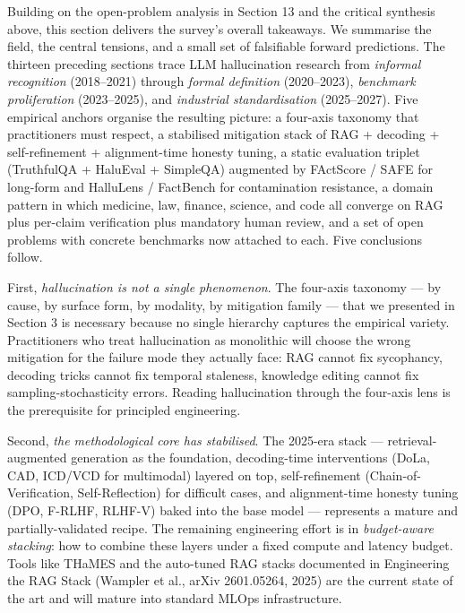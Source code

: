 \documentclass{article}
\begin{document}
Building on the open-problem analysis in Section 13 and the critical synthesis above, this section delivers the survey's overall takeaways. We summarise the field, the central tensions, and a small set of falsifiable forward predictions. The thirteen preceding sections trace LLM hallucination research from \emph{informal recognition} (2018--2021) through \emph{formal definition} (2020--2023), \emph{benchmark proliferation} (2023--2025), and \emph{industrial standardisation} (2025--2027). Five empirical anchors organise the resulting picture: a four-axis taxonomy that practitioners must respect, a stabilised mitigation stack of RAG + decoding + self-refinement + alignment-time honesty tuning, a static evaluation triplet (TruthfulQA + HaluEval + SimpleQA) augmented by FActScore / SAFE for long-form and HalluLens / FactBench for contamination resistance, a domain pattern in which medicine, law, finance, science, and code all converge on RAG plus per-claim verification plus mandatory human review, and a set of open problems with concrete benchmarks now attached to each. Five conclusions follow.

First, \emph{hallucination is not a single phenomenon}. The four-axis taxonomy --- by cause, by surface form, by modality, by mitigation family --- that we presented in Section 3 is necessary because no single hierarchy captures the empirical variety. Practitioners who treat hallucination as monolithic will choose the wrong mitigation for the failure mode they actually face: RAG cannot fix sycophancy, decoding tricks cannot fix temporal staleness, knowledge editing cannot fix sampling-stochasticity errors. Reading hallucination through the four-axis lens is the prerequisite for principled engineering.

Second, \emph{the methodological core has stabilised}. The 2025-era stack --- retrieval-augmented generation as the foundation, decoding-time interventions (DoLa, CAD, ICD/VCD for multimodal) layered on top, self-refinement (Chain-of-Verification, Self-Reflection) for difficult cases, and alignment-time honesty tuning (DPO, F-RLHF, RLHF-V) baked into the base model --- represents a mature and partially-validated recipe. The remaining engineering effort is in \emph{budget-aware stacking}: how to combine these layers under a fixed compute and latency budget. Tools like THaMES \citep{liang2024uhgevalbenchmarkin} and the auto-tuned RAG stacks documented in Engineering the RAG Stack (Wampler et al., arXiv 2601.05264, 2025) are the current state of the art and will mature into standard MLOps infrastructure.
\end{document}
